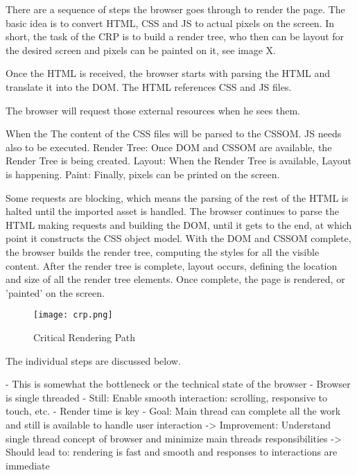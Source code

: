 There are a sequence of steps the browser goes through to render the page.
The basic idea is to convert HTML, CSS and JS to actual pixels on the screen.
In short, the task of the CRP is to build a render tree, who then can be layout for the desired screen and pixels can be painted on it, see image X.

Once the HTML is received, the browser starts with parsing the HTML and translate it into the DOM.
The HTML references CSS and JS files.

The browser will request those external resources when he sees them.



When the The content of the CSS files will be parsed to the CSSOM.
JS needs also to be executed.
Render Tree: Once DOM and CSSOM are available, the Render Tree is being created.
Layout: When the Render Tree is available, Layout is happening.
Paint: Finally, pixels can be printed on the screen.



Some requests are blocking, which means the parsing of the rest of the HTML is halted until the imported asset is handled. The browser continues to parse the HTML making requests and building the DOM, until it gets to the end, at which point it constructs the CSS object model. With the DOM and CSSOM complete, the browser builds the render tree, computing the styles for all the visible content. After the render tree is complete, layout occurs, defining the location and size of all the render tree elements. Once complete, the page is rendered, or 'painted' on the screen.



\begin{figure}[h!]
\begin{center}
\texttt{[image: crp.png]}
\caption{Critical Rendering Path}
\label{img:crp}
\end{center}
\end{figure}

The individual steps are discussed below.




- This is somewhat the bottleneck or the technical state of the browser
- Browser is single threaded
- Still: Enable smooth interaction: scrolling, responsive to touch, etc.
- Render time is key
- Goal: Main thread can complete all the work and still is available to handle user interaction
-> Improvement: Understand single thread concept of browser and minimize main threads responsibilities
-> Should lead to: rendering is fast and smooth and responses to interactions are immediate



